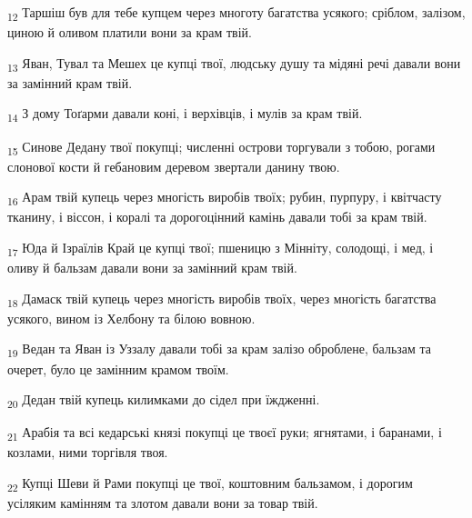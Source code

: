 \begin{tcolorbox}
\textsubscript{12} Таршіш був для тебе купцем через многоту багатства усякого; сріблом, залізом, циною й оливом платили вони за крам твій.
\end{tcolorbox}
\begin{tcolorbox}
\textsubscript{13} Яван, Тувал та Мешех це купці твої, людську душу та мідяні речі давали вони за замінний крам твій.
\end{tcolorbox}
\begin{tcolorbox}
\textsubscript{14} З дому Тоґарми давали коні, і верхівців, і мулів за крам твій.
\end{tcolorbox}
\begin{tcolorbox}
\textsubscript{15} Синове Дедану твої покупці; численні острови торгували з тобою, рогами слонової кости й гебановим деревом звертали данину твою.
\end{tcolorbox}
\begin{tcolorbox}
\textsubscript{16} Арам твій купець через многість виробів твоїх; рубин, пурпуру, і квітчасту тканину, і віссон, і коралі та дорогоцінний камінь давали тобі за крам твій.
\end{tcolorbox}
\begin{tcolorbox}
\textsubscript{17} Юда й Ізраїлів Край це купці твої; пшеницю з Мінніту, солодощі, і мед, і оливу й бальзам давали вони за замінний крам твій.
\end{tcolorbox}
\begin{tcolorbox}
\textsubscript{18} Дамаск твій купець через многість виробів твоїх, через многість багатства усякого, вином із Хелбону та білою вовною.
\end{tcolorbox}
\begin{tcolorbox}
\textsubscript{19} Ведан та Яван із Уззалу давали тобі за крам залізо оброблене, бальзам та очерет, було це замінним крамом твоїм.
\end{tcolorbox}
\begin{tcolorbox}
\textsubscript{20} Дедан твій купець килимками до сідел при їждженні.
\end{tcolorbox}
\begin{tcolorbox}
\textsubscript{21} Арабія та всі кедарські князі покупці це твоєї руки; ягнятами, і баранами, і козлами, ними торгівля твоя.
\end{tcolorbox}
\begin{tcolorbox}
\textsubscript{22} Купці Шеви й Рами покупці це твої, коштовним бальзамом, і дорогим усіляким камінням та злотом давали вони за товар твій.
\end{tcolorbox}
